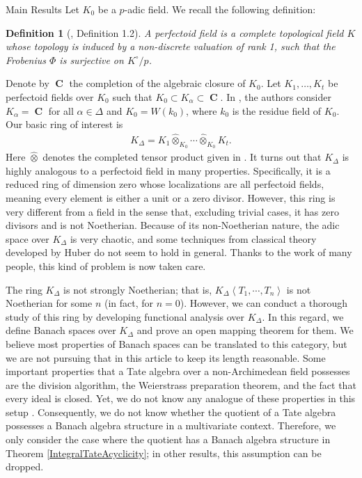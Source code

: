 \documentclass[12pts,a4paper]{amsart}
\newtheorem{definition}[proposition]{Definition}
\DeclareMathOperator{\C}{\textbf{C}}
\begin{document}
\begin{subsection}{Main Results}
   Let $K_0$ be a $p$-adic field. We recall the following definition:
  \begin{definition}[\cite{Sch}, Definition 1.2]
  A perfectoid field is a complete topological field $K$ whose topology is induced by a non-discrete valuation of rank 1, such that the Frobenius $\Phi$ is surjective on $K^\circ/p$.
  \end{definition}
  Denote by $\C$ the completion of the algebraic closure of $K_0$. Let $K_1,\ldots,K_t$ be perfectoid fields over $K_0$ such that $K_0\subset K_\alpha\subset \C$. In \cite{Bri}, the authors consider $K_\alpha=\C$ for all $\alpha\in\Delta$ and $K_0=W(k_0)$, where $k_0$ is the residue field of $K_0$. Our basic ring of interest is
  \begin{align*}
  K_\Delta=K_1\hat{\otimes}_{K_0}\cdots\hat{\otimes}_{K_0}K_t.
  \end{align*}
  Here $\hat{\otimes}$ denotes the completed tensor product given in \cite{BGR}.
  It turns out that $K_\Delta$ is highly analogous to a perfectoid field in many properties. Specifically, it is a reduced ring of dimension zero whose localizations are all perfectoid fields, meaning every element is either a unit or a zero divisor. However, this ring is very different from a field in the sense that, excluding trivial cases, it has zero divisors and is not Noetherian. Because of its non-Noetherian nature, the adic space over $K_\Delta$ is very chaotic, and some techniques from classical theory \cite{Hubet} developed by Huber do not seem to hold in general. Thanks to the work of many people, this kind of problem is now taken care.

  The ring $K_\Delta$ is not strongly Noetherian; that is, $K_\Delta\left<T_1,\cdots,T_n\right>$ is not Noetherian for some $n$ (in fact, for $n=0$). However, we can conduct a thorough study of this ring by developing functional analysis over $K_\Delta$. In this regard, we define Banach spaces over $K_\Delta$ and prove an open mapping theorem for them. We believe most properties of Banach spaces can be translated to this category, but we are not pursuing that in this article to keep its length reasonable. Some important properties that a Tate algebra over a non-Archimedean field possesses are the division algorithm, the Weierstrass preparation theorem, and the fact that every ideal is closed. Yet, we do not know any analogue of these properties in this setup \cite{BGR,FormalRigid}. Consequently, we do not know whether the quotient of a Tate algebra possesses a Banach algebra structure in a multivariate context. Therefore, we only consider the case where the quotient has a Banach algebra structure in Theorem \ref{IntegralTateAcyclicity}; in other results, this assumption can be dropped.


\end{subsection}
\end{document}
